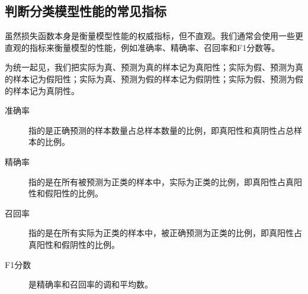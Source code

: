 \subsection{判断分类模型性能的常见指标}

虽然损失函数本身是衡量模型性能的权威指标，但不直观。我们通常会使用一些更直观的指标来衡量模型的性能，例如准确率、精确率、召回率和F1分数等。

为统一起见，我们把实际为真、预测为真的样本记为真阳性；实际为假、预测为真的样本记为假阳性；实际为真、预测为假的样本记为假阴性；实际为假、预测为假的样本记为真阴性。

\begin{description}
    \item[准确率] 指的是正确预测的样本数量占总样本数量的比例，即真阳性和真阴性占总样本的比例。
    \item[精确率] 指的是在所有被预测为正类的样本中，实际为正类的比例，即真阳性占真阳性和假阳性的比例。
    \item[召回率] 指的是在所有实际为正类的样本中，被正确预测为正类的比例，即真阳性占真阳性和假阴性的比例。
    \item[F1分数] 是精确率和召回率的调和平均数。
\end{description}

